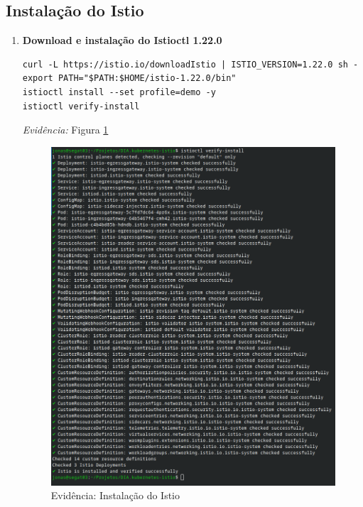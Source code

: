 \documentclass[12pt,a4paper]{report}
\begin{document}
\subsection{Instalação do Istio}
\begin{enumerate}
    \item\textbf{Download e instalação do Istioctl 1.22.0}
\begin{lstlisting}[style=shell]
curl -L https://istio.io/downloadIstio | ISTIO_VERSION=1.22.0 sh -
export PATH="$PATH:$HOME/istio-1.22.0/bin"
istioctl install --set profile=demo -y
istioctl verify-install
\end{lstlisting}
\textit{Evidência:} Figura \ref{fig:istio}\\

\begin{figure}[h]
    \centering
    \includegraphics[width=1\linewidth]{figures/evidence-istio.png}
    \caption{Evidência: Instalação do Istio}
    \label{fig:istio}
\end{figure}
\end{enumerate}
\end{document}
